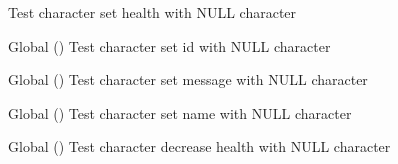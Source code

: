 \begin{DoxyRefList}
%
Test character set health with NULL character  
\item[Global \doxylink{character__test_8c_acee8dbf1f524f775b598e4a58136cc53}{test2\+\_\+character\+\_\+set\+\_\+id} ()]\label{test__test000005}%
%
Test character set id with NULL character  
\item[Global \doxylink{character__test_8c_afae2256c79ebaf31b7402307dad69253}{test2\+\_\+character\+\_\+set\+\_\+message} ()]\label{test__test000027}%
%
Test character set message with NULL character  
\item[Global \doxylink{character__test_8c_a74b160bc91661973b864acec8b9a16ce}{test2\+\_\+character\+\_\+set\+\_\+name} ()]\label{test__test000009}%
%
Test character set name with NULL character  
\item[Global \doxylink{player__test_8c_a8c0cb9c6989aa43c2e38c120a6644250}{test2\+\_\+decrease\+\_\+health} ()]\label{test__test000019}%
%
Test character decrease health with NULL character 


\end{DoxyRefList}
